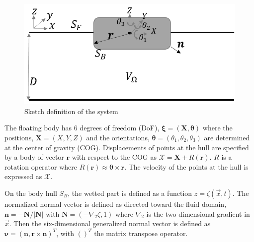 \documentclass[12pt,a4paper,titlepage]{article}
\newcommand{\bs}{\boldsymbol}
\begin{document}
\begin{figure}[ht]
\centering
\includegraphics[scale=0.7,trim = 0mm 0mm 0mm 0mm, clip]{figures/Sketch.png}	
\caption{Sketch definition of the system}\label{fig:sketch}
\end{figure}

The floating body has 6 degrees of freedom (DoF), $\bs\xi=(\bs{X},\bs{\theta})$ where the positions, $\bs{X}=(X,Y,Z)$ and the orientations, $\bs{\theta}=(\theta_1,\theta_2,\theta_3)$ are determined at the center of gravity (COG). Displacements of points at the hull are specified by a body of vector $\bs r$ with respect to the COG as $\bs{\mathcal{X}}=\bs{X}+R(\bs{r})$. $R$ is a rotation operator where $R(\bs r)\approx \bs \theta \times \bs r$. The velocity of the points at the hull is expressed as $\dot{\bs{\mathcal{X}}}$.

On the body hull $S_B$, the wetted part is defined as a function $z=\zeta(\vec{x},t)$. The normalized normal vector is defined as directed toward the fluid domain,  $\bs n=-\bs N/|\bs N|$ with $\bs N=\left(-\nabla_2\zeta,1 \right)$ where $\nabla_2$ is the two-dimensional gradient in $\vec{x}$. Then the six-dimensional generalized normal vector is defined as $\bs \nu=(\bs n,\bs r \times \bs n)^T$, with $( )^T$ the matrix transpose operator.
\end{document}
